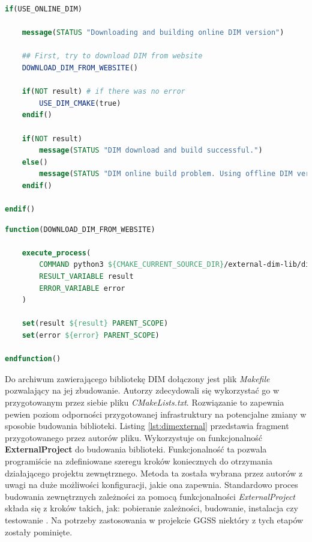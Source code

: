 \begin{lstlisting}[language=cmake, caption={Fragment pliku \textit{dim\_build.cmake} przedstawiający proces budowania nowej, pobranej ze strony internetowej wersji biblioteki DIM. Widoczne wywołania zdefiniowanych przez autorów funkcji. }, label={lst:dimonlinebuild}]
if(USE_ONLINE_DIM)

    message(STATUS "Downloading and building online DIM version")

    ## First, try to download DIM from website
    DOWNLOAD_DIM_FROM_WEBSITE()

    if(NOT result) # if there was no error
        USE_DIM_CMAKE(true)
    endif()

    if(NOT result)
        message(STATUS "DIM download and build successful.")
    else()
        message(STATUS "DIM online build problem. Using offline DIM version.")
    endif()

endif()
\end{lstlisting}

\begin{lstlisting}[language=cmake, caption={Przykład funkcji zdefiniowanej w skrypcie CMake. Funkcja wykorzystuje komendę \textit{execute\_process} do wykonania skryptu pobierającego bibliotekę DIM z jej strony internetowej.}, label={lst:dimdown}]
function(DOWNLOAD_DIM_FROM_WEBSITE)

    execute_process(
        COMMAND python3 ${CMAKE_CURRENT_SOURCE_DIR}/external-dim-lib/dim_download.py
        RESULT_VARIABLE result
        ERROR_VARIABLE error
    )

    set(result ${result} PARENT_SCOPE)
    set(error ${error} PARENT_SCOPE)

endfunction()
\end{lstlisting}

Do archiwum zawierającego bibliotekę DIM dołączony jest plik \textit{Makefile} pozwalający na jej zbudowanie. Autorzy zdecydowali się wykorzystać go w przygotowanym przez siebie pliku \textit{CMakeLists.txt}. Rozwiązanie to zapewnia pewien poziom odporności przygotowanej infrastruktury na potencjalne zmiany w sposobie budowania biblioteki. Listing \ref{lst:dimexternal} przedstawia fragment przygotowanego przez autorów pliku. Wykorzystuje on funkcjonalność \textbf{ExternalProject} do budowania biblioteki. Funkcjonalność ta pozwala programiście na zdefiniowane szeregu kroków koniecznych do otrzymania działającego projektu zewnętrznego. Metoda ta została wybrana przez autorów z uwagi na duże możliwości konfiguracji, jakie ona zapewnia. Standardowo proces budowania zewnętrznych zależności za pomocą funkcjonalności \textit{ExternalProject} składa się z kroków takich, jak: pobieranie zależności, budowanie, instalacja czy testowanie \cite{CMakeExternalProject}. Na potrzeby zastosowania w projekcie GGSS niektóry z tych etapów zostały pominięte. 



